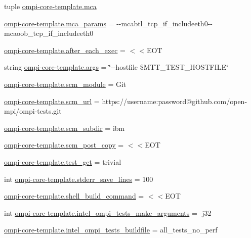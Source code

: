 \begin{DoxyCompactItemize}
\item 
tuple \hyperlink{namespaceompi-core-template_a8bec0c2630d37f5891ff642df3f9de76}{ompi-\/core-\/template.\-mca}
\item 
\hyperlink{namespaceompi-core-template_a3972657d18b13fbec48e9fc366ff07f0}{ompi-\/core-\/template.\-mca\-\_\-params} = -\/-\/mcabtl\-\_\-tcp\-\_\-if\-\_\-includeeth0-\/-\/mcaoob\-\_\-tcp\-\_\-if\-\_\-includeeth0
\item 
\hyperlink{namespaceompi-core-template_abbdf846bd4f4a4b6f3e7a6933e678f17}{ompi-\/core-\/template.\-after\-\_\-each\-\_\-exec} = $<$$<$E\-O\-T
\item 
string \hyperlink{namespaceompi-core-template_ae07cf7e00726c06dc500a54b713819c8}{ompi-\/core-\/template.\-args} = \char`\"{}-\/-\/hostfile \$M\-T\-T\-\_\-\-T\-E\-S\-T\-\_\-\-H\-O\-S\-T\-F\-I\-L\-E\char`\"{}
\item 
\hyperlink{namespaceompi-core-template_afa2204401b4cd6514dd6997ff3f38dc6}{ompi-\/core-\/template.\-scm\-\_\-module} = Git
\item 
\hyperlink{namespaceompi-core-template_a2ed15964d614776a50965e42acd911ec}{ompi-\/core-\/template.\-scm\-\_\-url} = https\-://username\-:password@github.\-com/open-\/mpi/ompi-\/tests.\-git
\item 
\hyperlink{namespaceompi-core-template_a5373b4e1981d8856efbaed9c52074bae}{ompi-\/core-\/template.\-scm\-\_\-subdir} = ibm
\item 
\hyperlink{namespaceompi-core-template_a8a118b9a1ada232fcd1d1f042d7d00ab}{ompi-\/core-\/template.\-scm\-\_\-post\-\_\-copy} = $<$$<$E\-O\-T
\item 
\hyperlink{namespaceompi-core-template_a075a5d52fcb2adb80f97aecc076193cd}{ompi-\/core-\/template.\-test\-\_\-get} = trivial
\item 
int \hyperlink{namespaceompi-core-template_acd0619b0cba198ab183cab48b2cd2871}{ompi-\/core-\/template.\-stderr\-\_\-save\-\_\-lines} = 100
\item 
\hyperlink{namespaceompi-core-template_a4cde9a1f50b8bdd6e68415d96d2ffdea}{ompi-\/core-\/template.\-shell\-\_\-build\-\_\-command} = $<$$<$E\-O\-T
\item 
int \hyperlink{namespaceompi-core-template_a40c7b7a488e20c19bcf9d376fc8c0020}{ompi-\/core-\/template.\-intel\-\_\-ompi\-\_\-tests\-\_\-make\-\_\-arguments} = -\/j32
\item 
\hyperlink{namespaceompi-core-template_a9a520c9ab3479f4c752dd61fa30f84ad}{ompi-\/core-\/template.\-intel\-\_\-ompi\-\_\-tests\-\_\-buildfile} = all\-\_\-tests\-\_\-no\-\_\-perf
$$
\end{DoxyCompactItemize}

